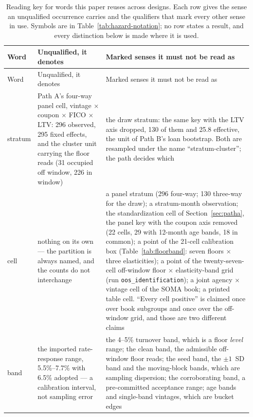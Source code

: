 \documentclass[12pt]{article}
\begin{document}
\begin{table}[H]
\begin{threeparttable}
\begin{tablenotes}[flushleft]
\end{tablenotes}
\end{threeparttable}
\end{table}

{\footnotesize
\begin{longtable}{@{}p{1.5cm}p{6.2cm}p{6.2cm}@{}}
\caption{Reading key for words this paper reuses across designs. Each row gives the sense an unqualified occurrence carries and the qualifiers that mark every other sense in use. Symbols are in Table~\ref{tab:hazard-notation}; no row states a result, and every distinction below is made where it is used.}
\label{tab:terminology}\\
\toprule
Word & Unqualified, it denotes & Marked senses it must not be read as \\
\midrule
\endfirsthead
\toprule
Word & Unqualified, it denotes & Marked senses it must not be read as \\
\midrule
\endhead
stratum & Path A's four-way panel cell, vintage $\times$ coupon $\times$ FICO $\times$ LTV: 296 observed, 295 fixed effects, and the cluster unit carrying the floor reads (31 occupied off window, 226 in window) & the draw stratum: the same key with the LTV axis dropped, 130 of them and 25.8 effective, the unit of Path B's loan bootstrap. Both are resampled under the name ``stratum-cluster''; the path decides which \\
cell & nothing on its own --- the partition is always named, and the counts do not interchange & a panel stratum (296 four-way; 130 three-way for the draw); a stratum-month observation; the standardization cell of Section~\ref{sec:patha}, the panel key with the coupon axis removed (22 cells, 29 with 12-month age bands, 18 in common); a point of the 21-cell calibration box (Table~\ref{tab:floorband}: seven floors $\times$ three elasticities); a point of the twenty-seven-cell off-window floor $\times$ elasticity-band grid (run \texttt{oos\_identification}); a joint agency $\times$ vintage cell of the SOMA book; a printed table cell. ``Every cell positive'' is claimed once over book subgroups and once over the off-window grid, and those are two different claims \\
band & the imported rate-response range, 5.5\%--7.7\% with 6.5\% adopted --- a calibration interval, not sampling error & the 4--5\% turnover band, which is a floor \emph{level} range; the clean band, the admissible off-window floor reads; the seed band, the $\pm 1$~SD band and the moving-block bands, which are sampling dispersion; the corroborating band, a pre-committed acceptance range; age bands and single-band vintages, which are bucket edges \\

\end{longtable}}
\end{document}
